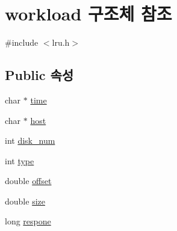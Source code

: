 \hypertarget{structworkload}{\section{workload 구조체 참조}
\label{structworkload}
}


{\ttfamily \#include $<$lru.\+h$>$}

\subsection*{Public 속성}
\begin{DoxyCompactItemize}
\item 
char $\ast$ \hyperlink{structworkload_a4401c89ba5cdd383f04301470e163cfd}{time}
\item 
char $\ast$ \hyperlink{structworkload_a3d757b51dfb82980f5a979a97bf0dfa1}{host}
\item 
int \hyperlink{structworkload_ac5fbfd8a1e652dc2b6e742ce685eb1fa}{disk\+\_\+num}
\item 
int \hyperlink{structworkload_aa2845ad1d10cf7ef276771aa7c038c40}{type}
\item 
double \hyperlink{structworkload_a05766e7402dae7d93f0f6602e4498a36}{offset}
\item 
double \hyperlink{structworkload_a5a1b5a6bbc572a36211bb56219e41d2e}{size}
\item 
long \hyperlink{structworkload_a8de001cbb458db8f4502435a2a6c2030}{respone}
\end{DoxyCompactItemize}


